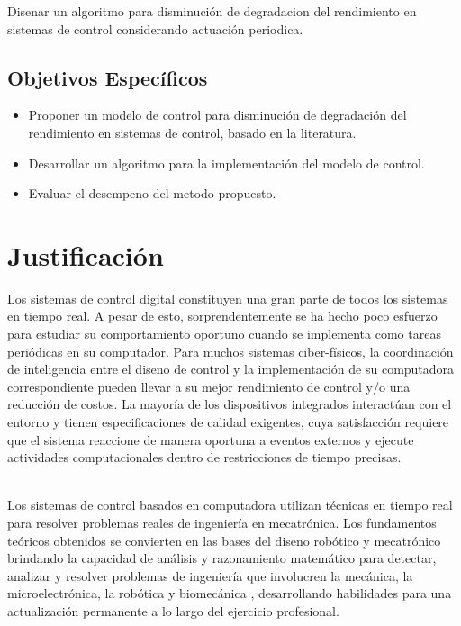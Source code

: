 \documentclass[12pt,a4paper]{book}
\begin{document}
\begin{normalsize}
Dise\-nar un algoritmo para disminuci\'on de degradacion del rendimiento en sistemas de control considerando actuaci\'on periodica.
\end{normalsize}

\subsection{Objetivos Espec\'ificos}

\begin{itemize} 
\item Proponer un modelo de control para disminuci\'on de degradaci\'on del rendimiento en sistemas de control, basado en la literatura. 
\item Desarrollar un algoritmo para la implementaci\'on del modelo de control. 
\item Evaluar el desempe\-no del metodo propuesto. 
\end{itemize}





\section{Justificaci\'on}
\begin{normalsize}
Los sistemas de control digital constituyen una gran parte de todos los sistemas en tiempo real.
A pesar de esto, sorprendentemente se ha hecho poco esfuerzo para estudiar su comportamiento oportuno cuando se implementa como tareas peri\'odicas en su computador. Para muchos sistemas ciber-f\'isicos, la coordinaci\'on de inteligencia entre el dise\-no de control y la implementaci\'on de su computadora correspondiente pueden llevar a su mejor rendimiento de control y/o una reducci\'on de costos. La mayor\'ia de los dispositivos integrados interact\'uan con el entorno y tienen especificaciones de calidad exigentes, cuya satisfacci\'on requiere que el sistema reaccione de manera oportuna a eventos  externos y ejecute actividades computacionales dentro de restricciones de tiempo precisas.

\hfill \break\\

Los sistemas de control basados en computadora utilizan t\'ecnicas en tiempo real para resolver problemas reales de ingenier\'ia en mecatr\'onica. Los fundamentos te\'oricos obtenidos se convierten en las bases del dise\-no rob\'otico y mecatr\'onico brindando la capacidad de an\'alisis y razonamiento matem\'atico para detectar, analizar y resolver problemas de ingenier\'ia que involucren la mec\'anica, la microelectr\'onica, la rob\'otica y biomec\'anica , desarrollando habilidades para una actualizaci\'on permanente a lo largo del ejercicio profesional.

\end{normalsize}
\end{document}
